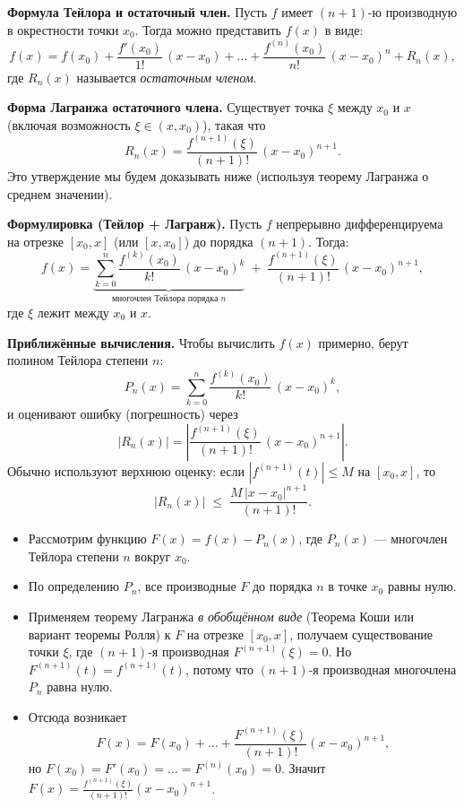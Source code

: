 

\textbf{Формула Тейлора и остаточный член.}
Пусть $f$ имеет $(n+1)$-ю производную в окрестности точки $x_0$. Тогда можно представить $f(x)$ в виде:
\[
f(x) = f(x_0) + \frac{f'(x_0)}{1!}\,(x - x_0) + \dots + \frac{f^{(n)}(x_0)}{n!}\,(x - x_0)^n + R_n(x),
\]
где $R_n(x)$ называется \emph{остаточным членом}.

\medskip

\textbf{Форма Лагранжа остаточного члена.}
Существует точка $\xi$ между $x_0$ и $x$ (включая возможность $\xi \in (x,x_0)$), такая что
\[
R_n(x) = \frac{f^{(n+1)}(\xi)}{(n+1)!}\,(x - x_0)^{n+1}.
\]
Это утверждение мы будем доказывать ниже (используя теорему Лагранжа о среднем значении).

\medskip


\textbf{Формулировка (Тейлор + Лагранж).}
Пусть $f$ непрерывно дифференцируема на отрезке $[x_0,x]$ (или $[x,x_0]$) до порядка $(n+1)$. Тогда:
\[
f(x) = \underbrace{\sum_{k=0}^{n} \frac{f^{(k)}(x_0)}{k!}\,(x-x_0)^k}_{\text{многочлен Тейлора порядка }n} \;+\; \frac{f^{(n+1)}(\xi)}{(n+1)!}\,(x - x_0)^{n+1},
\]
где $\xi$ лежит между $x_0$ и $x$.

\medskip

\textbf{Приближённые вычисления.}
Чтобы вычислить $f(x)$ примерно, берут полином Тейлора степени $n$:
\[
P_n(x) = \sum_{k=0}^{n} \frac{f^{(k)}(x_0)}{k!}\,(x - x_0)^k,
\]
и оценивают ошибку (погрешность) через
\[
|R_n(x)| = \left|\frac{f^{(n+1)}(\xi)}{(n+1)!}\,(x - x_0)^{n+1}\right|.
\]
Обычно используют верхнюю оценку: если $|f^{(n+1)}(t)| \le M$ на $[x_0,x]$, то
\[
|R_n(x)| \;\le\; \frac{M\,|x - x_0|^{n+1}}{(n+1)!}.
\]

\medskip


\begin{itemize}
  \item Рассмотрим функцию $F(x) = f(x) - P_n(x)$, где $P_n(x)$ — многочлен Тейлора степени $n$ вокруг $x_0$.  
  \item По определению $P_n$, все производные $F$ до порядка $n$ в точке $x_0$ равны нулю.  
  \item Применяем теорему Лагранжа \textit{в обобщённом виде} (Теорема Коши или вариант теоремы Ролля) к $F$ на отрезке $[x_0,x]$, получаем существование точки $\xi$, где $(n+1)$-я производная $F^{(n+1)}(\xi)=0$. Но $F^{(n+1)}(t)=f^{(n+1)}(t)$, потому что $(n+1)$-я производная многочлена $P_n$ равна нулю.  
  \item Отсюда возникает
  \[
  F(x) = F(x_0) + \dots + \frac{F^{(n+1)}(\xi)}{(n+1)!} (x-x_0)^{n+1},
  \]
  но $F(x_0)=F'(x_0)=\dots=F^{(n)}(x_0)=0$. Значит $F(x)=\frac{f^{(n+1)}(\xi)}{(n+1)!}(x-x_0)^{n+1}$.
\end{itemize}

